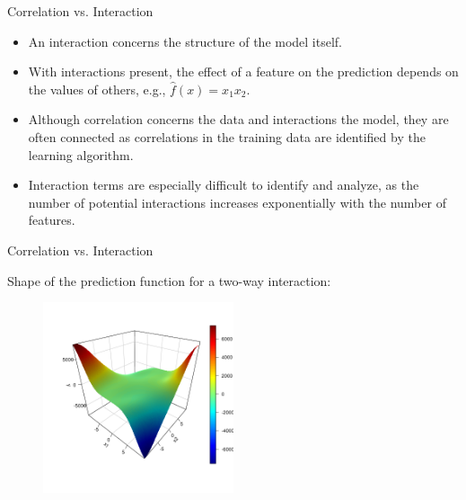 \documentclass[11pt,compress,t,notes=noshow, aspectratio=169, xcolor=table]{beamer}
\begin{document}

\begin{frame}{Correlation vs. Interaction}
\begin{itemize}
\item An interaction concerns the structure of the model itself.
\item With interactions present, the effect of a feature on the prediction depends on the values of others, e.g., $\widehat{f}(x) = x_1 x_2$.
\item Although correlation concerns the data and interactions the model, they are often connected as correlations in the training data are identified by the learning algorithm.
\item Interaction terms are especially difficult to identify and analyze, as the number of potential interactions increases exponentially with the number of features.
\end{itemize}
\end{frame}

\begin{frame}{Correlation vs. Interaction}

Shape of the prediction function for a two-way interaction:

\begin{figure}
\includegraphics[width = 0.5\textwidth]{figure/interaction}
\end{figure}
\end{frame}
\end{document}
